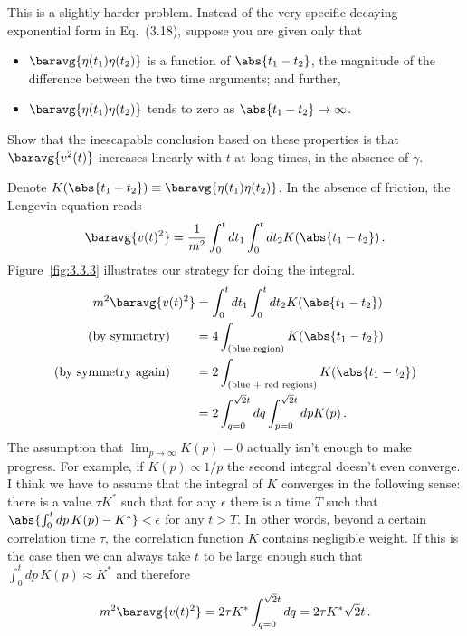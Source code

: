 

This is a slightly harder problem.
Instead of the very specific decaying exponential form in Eq.~(3.18), suppose you are given only that
\begin{itemize}
  \item $\baravg{\eta(t_1)\eta(t_2)}$ is a function of $\abs{t_1-t_2}$, the magnitude of the difference between the two time arguments; and further,
  \item $\baravg{\eta(t_1)\eta(t_2)}$ tends to zero as $\abs{t_1 - t_2} \rightarrow \infty$.
\end{itemize}
Show that the inescapable conclusion based on these properties is that $\baravg{v^2(t)}$ increases linearly with $t$ at long times, in the absence of $\gamma$.


Denote $K(\abs{t_1 - t_2}) \equiv \baravg{\eta(t_1)\eta(t_2)}$.
In the absence of friction, the Lengevin equation reads
\begin{equation*}
  \baravg{v(t)^2} = \frac{1}{m^2} \int_0^t dt_1 \int_0^t dt_2 K(\abs{t_1 - t_2}) \, .
\end{equation*}
Figure~\ref{fig:3.3.3} illustrates our strategy for doing the integral.
\begin{align*}
  m^2 \baravg{v(t)^2}
  &= \int_0^t dt_1 \int_0^t dt_2 K(\abs{t_1 - t_2}) \\
  \text{(by symmetry)} \qquad &= 4 \int_\text{(blue region)} K(\abs{t_1 - t_2}) \\
  \text{(by symmetry again)} \qquad &= 2 \int_\text{(blue + red regions)} K(\abs{t_1 - t_2}) \\
  &= 2 \int_{q=0}^{\sqrt{2}t} dq \int_{p=0}^{\sqrt{2}t}dp  K(p) \, .
\end{align*}
The assumption that $\lim_{p \rightarrow \infty} K(p) = 0$ actually isn't enough to make progress.
For example, if $K(p) \propto 1/p$ the second integral doesn't even converge.
I think we have to assume that the integral of $K$ converges in the following sense: there is a value $\tau K^*$ such that for any $\epsilon$ there is a time $T$ such that $\abs{\int_0^t dp \, K(p) - K^*} < \epsilon$ for any $t > T$.
In other words, beyond a certain correlation time $\tau$, the correlation function $K$ contains negligible weight.
If this is the case then we can always take $t$ to be large enough such that $\int_0^t dp \, K(p) \approx K^*$ and therefore
\begin{equation*}
  m^2 \baravg{v(t)^2} = 2 \tau K^* \int_{q=0}^{\sqrt{2} t} dq = 2 \tau K^* \sqrt{2} t
  \, .
\end{equation*}

